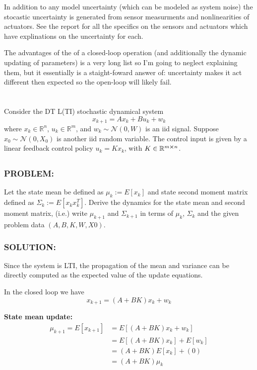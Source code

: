 \documentclass[]{article}
\newcommand{\Problem}{\subsubsection*{\textbf{PROBLEM:}}}
\newcommand{\Solution}{\subsubsection*{\textbf{SOLUTION:}}}
\newcommand{\R}{\mathbb{R}}
\begin{document}
In addition to any model uncertainty (which can be modeled as system noise) the stocastic uncertainty is generated from sensor measurments and nonlinearities of actuators. 
See the report for all the specifics on the sensors and actuators which have explinations on the uncertainty for each.

The advantages of the of a closed-loop operation (and additionally the dynamic updating of parameters) is a very long list so I'm going to neglect explaining them, but it essentially is a staight-foward answer of: uncertainty makes it act different then expected so the open-loop will likely fail.


\newpage
\section{}
Consider the DT L(TI) stochastic dynamical system 
\begin{equation}
    x_{k+1} = A x_k + B u_k + w_k
\end{equation}
where $x_k \in \R^n$, $u_k \in \R^m$, and $w_k \sim \mathcal{N}(0,W)$ is an iid signal.
Suppose $x_0 \sim \mathcal{N}(0,X_0)$ is another iid random variable.
The control input is given by a linear feedback control policy $u_k = K x_k$, with $K \in \R^{m \cross n}$.

\subsection{}
\Problem
Let the state mean be defined as $\mu_k := E[x_k]$ and state second moment matrix defined as $\Sigma_k := E[x_k x_k^T]$.
Derive the dynamics for the state mean and second moment matrix,
(i.e.) write $\mu_{k+1}$ and $\Sigma_{k+1}$ in terms of $\mu_k$, $\Sigma_k$ and the given problem data $(A, B, K, W, X0)$.

\Solution
Since the system is LTI, the propagation of the mean and variance can be directly computed as the expected value of the update equations.

In the closed loop we have \[x_{k+1} = (A+BK) x_k + w_k\]

\textbf{State mean update:}
\begin{align*}
    \mu_{k+1} = E[x_{k+1}] 
        &= E[(A+BK) x_k + w_k]\\
        &= E[(A+BK) x_k] + E[w_k]\\
        &= (A+BK) E[x_k] + (0)\\
        &= (A+BK) \mu_k
\end{align*}
\end{document}
